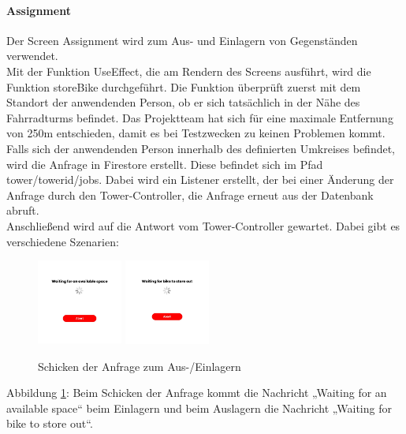 \paragraph{Assignment}Der Screen Assignment wird zum Aus- und Einlagern von Gegenständen verwendet.\\
Mit der Funktion UseEffect, die am Rendern des Screens ausführt, wird die Funktion storeBike durchgeführt. Die Funktion überprüft zuerst mit dem Standort der anwendenden Person, ob er sich tatsächlich in der Nähe des Fahrradturms befindet. Das Projektteam hat sich für eine maximale Entfernung von 250m entschieden, damit es bei Testzwecken zu keinen Problemen kommt. \\
Falls sich der anwendenden Person innerhalb des definierten Umkreises befindet, wird die Anfrage in Firestore erstellt. Diese befindet sich im Pfad tower/towerid/jobs. Dabei wird ein Listener erstellt, der bei einer Änderung der Anfrage durch den Tower-Controller, die Anfrage erneut aus der Datenbank abruft.\\
Anschließend wird auf die Antwort vom Tower-Controller gewartet. Dabei gibt es verschiedene Szenarien:\\
\begin{figure}[H]
    \centering
    \includegraphics[width=0.25\textwidth]{images/app-screenshots/waitinga.png}
    \includegraphics[width=0.25\textwidth]{images/app-screenshots/waitingb.png}
    \caption{Schicken der Anfrage zum Aus-/Einlagern}
    \label{fig:screenwaiting}
\end{figure}
Abbildung \ref{fig:screenwaiting}: Beim Schicken der Anfrage kommt die Nachricht „Waiting for an available space“ beim Einlagern und beim Auslagern die Nachricht „Waiting for bike to store out“.\\
